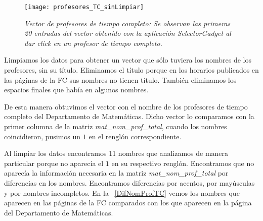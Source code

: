 \begin{figure}[H]
\centering
\texttt{[image: profesores\_TC\_sinLimpiar]} %
\caption[\textit{Vector de profesores de tiempo completo}]{\textit{Vector de profesores de tiempo completo: Se observan las primeras 20 entradas del vector obtenido con la aplicación SelectorGadget al dar click en un profesor de tiempo completo.}}\label{profTC_sinLimpiar}
\end{figure}

Limpiamos los datos para obtener un vector que sólo tuviera los nombres de los profesores, sin su título. Eliminamos el título porque en los horarios publicados en las páginas de la FC sus nombres no tienen título. También eliminamos los espacios finales que había en algunos nombres.

De esta manera obtuvimos el vector con el nombre de los profesores de tiempo completo del Departamento de Matemáticas. Dicho vector lo comparamos con la primer columna de la matriz \textit{mat\_nom\_prof\_total}, cuando los nombres coincidieron, pusimos un $1$ en el renglón correspondiente.

Al limpiar los datos encontramos 11 nombres que analizamos de manera particular porque no aparecía el $1$ en su respectivo renglón. Encontramos que no aparecía la información necesaria en la matriz \textit{mat\_nom\_prof\_total} por diferencias en los nombres. Encontramos diferencias por acentos, por mayúsculas y por nombres incompletos. En la \tablename{~\ref{DifNomProfTC}} vemos los nombres que aparecen en las páginas de la FC comparados con los que aparecen en la página del Departamento de Matemáticas.

